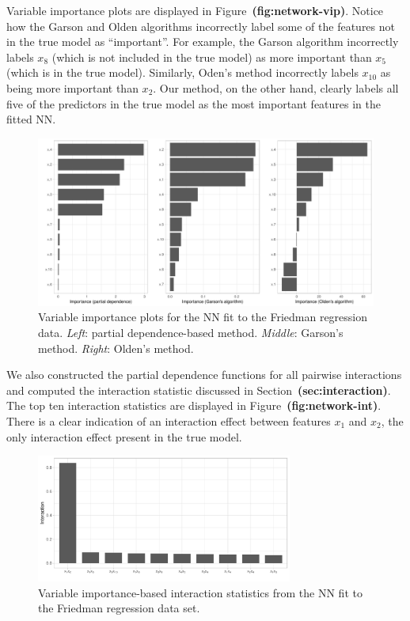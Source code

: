 \documentclass[12pt]{article}
\def\ref#1{\textbf{(#1)}}
\begin{document}
Variable importance plots are displayed in Figure~\ref{fig:network-vip}. Notice how the Garson and Olden algorithms incorrectly label some of the features not in the true model as ``important''. For example, the Garson algorithm incorrectly labels $x_8$ (which is not included in the true model) as more important than $x_5$ (which is in the true model). Similarly, Oden's method incorrectly labels $x_{10}$ as being more important than $x_2$. Our method, on the other hand, clearly labels all five of the predictors in the true model as the most important features in the fitted NN.

\begin{figure}[!htb]
  \centering
  \includegraphics[width=1.0\textwidth]{network-vip}
  \caption{Variable importance plots for the NN fit to the Friedman regression data. \textit{Left}: partial dependence-based method. \textit{Middle}: Garson's method. \textit{Right}: Olden's method. \label{fig:network-vip}}
\end{figure}

We also constructed the partial dependence functions for all pairwise interactions and computed the interaction statistic discussed in Section~\ref{sec:interaction}. The top ten interaction statistics are displayed in Figure~\ref{fig:network-int}. There is a clear indication of an interaction effect between features $x_1$ and $x_2$, the only interaction effect present in the true model.

\begin{figure}[!htb]
  \centering
  \includegraphics[width=0.75\textwidth]{network-int}
  \caption{Variable importance-based interaction statistics from the NN fit to the Friedman regression data set. \label{fig:network-int}}
\end{figure}
\end{document}
